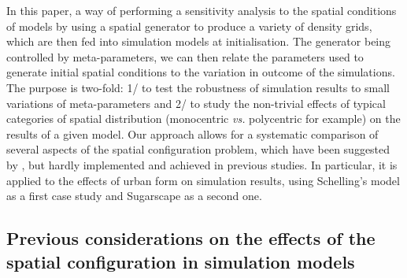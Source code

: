 \documentclass[3p,times,procedia]{elsarticle}
\begin{document}
In this paper,  a way of performing a sensitivity analysis to the spatial conditions of models by using a spatial generator to produce a variety of density grids, which are then fed into simulation models at initialisation. The generator being controlled by meta-parameters, we can then relate the parameters used to generate initial spatial conditions to the variation in outcome of the simulations. The purpose is two-fold: 1/ to test the robustness of simulation results to small variations of meta-parameters and 2/ to study the non-trivial effects of typical categories of spatial distribution (monocentric \textit{vs.} polycentric for example) on the results of a given model. Our approach allows for a systematic comparison of several aspects of the spatial configuration problem, which have been suggested by \citet{filatova2013spatial}, but hardly implemented and achieved in previous studies. In particular, it is applied to the effects of urban form on simulation results, using Schelling's model as a first case study and Sugarscape as a second one. 

\subsection{Previous considerations on the effects of the spatial configuration in simulation models}


\end{document}
